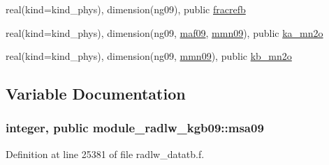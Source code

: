 \begin{DoxyCompactItemize}
\item 
real(kind=kind\+\_\+phys), dimension(ng09), public \hyperlink{group__module__radlw__main_ga26476f00fe13c1c81d3ae0cf8e43c90b}{fracrefb}
\item 
real(kind=kind\+\_\+phys), dimension(ng09, \hyperlink{group__module__radlw__main_ga7d5d565c87af7ef07dc17930f9cb9e57}{maf09}, \hyperlink{group__module__radlw__main_gaa9c8294b56ac3ce90b07114e986777a9}{mmn09}), public \hyperlink{group__module__radlw__main_ga37d98e8066c5995060a2a8451b45705f}{ka\+\_\+mn2o}
\item 
real(kind=kind\+\_\+phys), dimension(ng09, \hyperlink{group__module__radlw__main_gaa9c8294b56ac3ce90b07114e986777a9}{mmn09}), public \hyperlink{group__module__radlw__main_ga79326139db789012d47c4750917c2cdb}{kb\+\_\+mn2o}
\end{DoxyCompactItemize}


\subsection{Variable Documentation}
\subsubsection[{\texorpdfstring{msa09}{msa09}}]{\setlength{\rightskip}{0pt plus 5cm}integer, public module\+\_\+radlw\+\_\+kgb09\+::msa09}\hypertarget{namespacemodule__radlw__kgb09_ab739f0acab23f3140067506b396b3717}{}\label{namespacemodule__radlw__kgb09_ab739f0acab23f3140067506b396b3717}


Definition at line 25381 of file radlw\+\_\+datatb.\+f.

